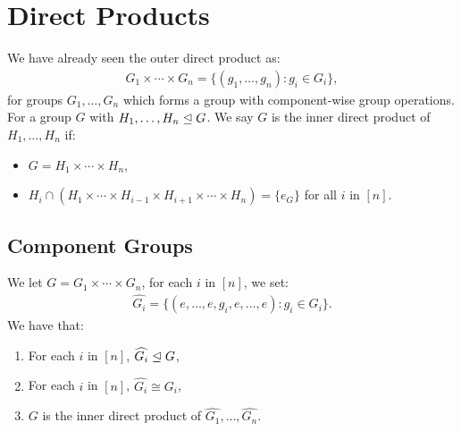 \section{Direct Products}

We have already seen the outer direct product as: \begin{align*}
    G_1 \times \cdots \times G_n = \{(g_1, \ldots, g_n) : g_i \in G_i\},
\end{align*} for groups $G_1, \ldots, G_n$ which forms a group with
component-wise group operations.
\\[\baselineskip]
For a group $G$ with $H_1, \ldots, H_n \trianglelefteq G$. We say $G$ is the
inner direct product of $H_1, \ldots, H_n$ if: \begin{itemize}
    \item $G = H_1 \times \cdots \times H_n$,
    \item $H_i \cap (H_1 \times \cdots \times H_{i - 1} 
        \times H_{i + 1} \times \cdots \times H_n) = \{e_G\}$ 
        for all $i$ in $[n]$.  
\end{itemize}

\subsection{Component Groups}

We let $G = G_1 \times \cdots \times G_n$, for each $i$ in $[n]$, we
set: \begin{align*}
    \widehat{G_i} = \{(e, \ldots, e, g_i, e, \ldots, e) : g_i \in G_i\}.
\end{align*} We have that: \begin{enumerate}
    \item For each $i$ in $[n]$, $\widehat{G_i} \trianglelefteq G$,
    \item For each $i$ in $[n]$, $\widehat{G_i} \cong G_i$,
    \item $G$ is the inner direct product of 
        $\widehat{G_1}, \ldots, \widehat{G_n}$.
\end{enumerate}

